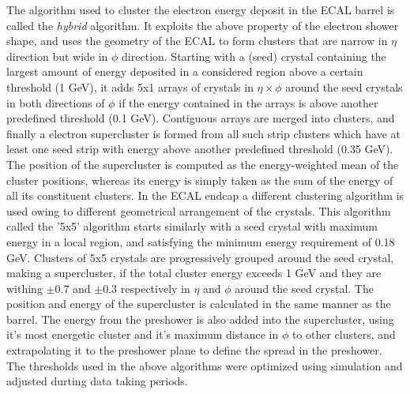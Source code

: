 The algorithm used to cluster the electron energy deposit in the ECAL barrel is called the \textit{hybrid} algorithm. It exploits the above property of the electron shower shape, and uses the geometry of the ECAL to form clusters that are narrow in $\eta$ direction but wide in $\phi$ direction. Starting with a (seed) crystal containing the largest amount of energy deposited in a considered region above a certain threshold (1 GeV), it adds 5x1 arrays of crystals in $\eta\times\phi$ around the seed crystals in both directions of $\phi$ if the energy contained in the arrays is above another predefined threshold (0.1 GeV). Contiguous arrays are merged into clusters, and finally a electron supercluster is formed from all such strip clusters which have at least one seed strip with energy above another predefined threshold (0.35 GeV). The position of the supercluster is computed as the energy-weighted mean of the cluster positions, whereas its energy is simply taken as the sum of the energy of all its constituent clusters. In the ECAL endcap a different clustering algorithm is used owing to different geometrical arrangement of the crystals. This algorithm called the '5x5' algorithm starts similarly with a seed crystal with maximum energy in a local region, and satisfying the minimum energy requirement of 0.18 GeV. Clusters of 5x5 crystals are progressively grouped around the seed crystal, making a supercluster, if the total cluster energy exceeds 1 GeV and they are withing $\pm 0.7$  and $\pm 0.3$ respectively in $\eta$ and $\phi$ around the seed crystal. The position and energy of the supercluster is calculated in the same manner as the barrel. The energy from the preshower is also added into the supercluster, using it's most energetic cluster and it's maximum distance in $\phi$ to other clusters, and extrapolating it to the preshower plane to define the spread in the preshower. The thresholds used in the above algorithms were optimized using simulation and adjusted durting data taking periods.

